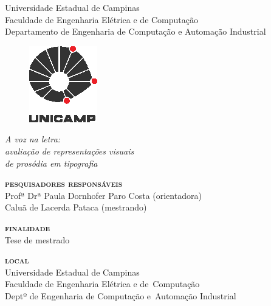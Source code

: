 \documentclass[a4paper,11pt,titlepage,singlespacing]{article}
\begin{document}
\begin{titlepage}
	\begin{center}
		Universidade Estadual de Campinas\\
		Faculdade de Engenharia Elétrica e de Computação\\ 
		Departamento de Engenharia de Computação e Automação Industrial \\ 
         \begin{figure}[htb]
             \centering
             \includegraphics[width=.08\linewidth]{imgs/unicamp.eps}
         \end{figure}
        \vspace{40pt}
        \huge\textit{A voz na letra: \\ avaliação de representações visuais \\ de prosódia em tipografia}\\
        
	\end{center}
	
	\vspace{60pt}
	
    \hspace{0.5\textwidth}\begin{minipage}{0.5\textwidth}
        \begin{flushleft}     
    
            \textbf{\textsc{pesquisadores responsáveis}} \\ Profª Drª Paula Dornhofer Paro Costa (orientadora) \\  \vspace{0.2cm} Caluã de Lacerda Pataca (mestrando)
    
            \vspace{0.8cm}
    
            \textbf{\textsc{finalidade}} \\ Tese de mestrado
    
            \vspace{0.8cm}
    
            \textbf{\textsc{local}} \\ Universidade Estadual de Campinas \\  \vspace{0.2cm} Faculdade de Engenharia Elétrica e de~Computação \\  \vspace{0.2cm} Deptº de Engenharia de Computação e~Automação Industrial
               

\end{flushleft}
\end{minipage}
\end{titlepage}
\end{document}
